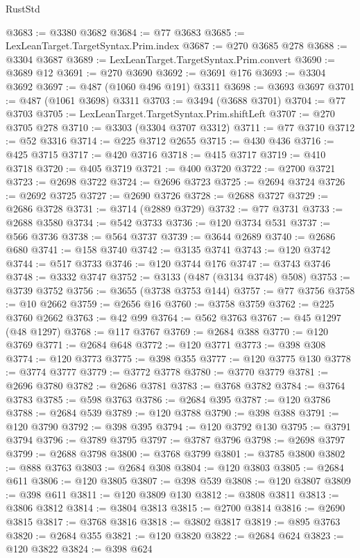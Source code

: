 \begin{lexlean}{RustStd}
\begin{coremodule}
@3683 := @3380 @3682
@3684 := @77 @3683
@3685 := LexLeanTarget.TargetSyntax.Prim.index
@3687 := @270 @3685 @278
@3688 := @3304 @3687
@3689 := LexLeanTarget.TargetSyntax.Prim.convert
@3690 := @3689 @12
@3691 := @270 @3690
@3692 := @3691 @176
@3693 := @3304 @3692
@3697 := @487 (@1060 @496 @191) @3311
@3698 := @3693 @3697
@3701 := @487 (@1061 @3698) @3311
@3703 := @3494 (@3688 @3701)
@3704 := @77 @3703
@3705 := LexLeanTarget.TargetSyntax.Prim.shiftLeft
@3707 := @270 @3705 @278
@3710 := @3303 (@3304 @3707 @3312)
@3711 := @77 @3710
@3712 := @52 @3316
@3714 := @225 @3712 @2655
@3715 := @430 @436
@3716 := @425 @3715
@3717 := @420 @3716
@3718 := @415 @3717
@3719 := @410 @3718
@3720 := @405 @3719
@3721 := @400 @3720
@3722 := @2700 @3721
@3723 := @2698 @3722
@3724 := @2696 @3723
@3725 := @2694 @3724
@3726 := @2692 @3725
@3727 := @2690 @3726
@3728 := @2688 @3727
@3729 := @2686 @3728
@3731 := @3714 (@2889 @3729)
@3732 := @77 @3731
@3733 := @2688 @3580
@3734 := @542 @3733
@3736 := @120 @3734 @531
@3737 := @566 @3736
@3738 := @564 @3737
@3739 := @3644 @2689
@3740 := @2686 @680
@3741 := @158 @3740
@3742 := @3135 @3741
@3743 := @120 @3742
@3744 := @517 @3733
@3746 := @120 @3744 @176
@3747 := @3743 @3746
@3748 := @3332 @3747
@3752 := @3133 (@487 (@3134 @3748) @508)
@3753 := @3739 @3752
@3756 := @3655 (@3738 @3753 @144)
@3757 := @77 @3756
@3758 := @10 @2662
@3759 := @2656 @16
@3760 := @3758 @3759
@3762 := @225 @3760 @2662
@3763 := @42 @99
@3764 := @562 @3763
@3767 := @45 @1297 (@48 @1297)
@3768 := @117 @3767
@3769 := @2684 @388
@3770 := @120 @3769
@3771 := @2684 @648
@3772 := @120 @3771
@3773 := @398 @308
@3774 := @120 @3773
@3775 := @398 @355
@3777 := @120 @3775 @130
@3778 := @3774 @3777
@3779 := @3772 @3778
@3780 := @3770 @3779
@3781 := @2696 @3780
@3782 := @2686 @3781
@3783 := @3768 @3782
@3784 := @3764 @3783
@3785 := @598 @3763
@3786 := @2684 @395
@3787 := @120 @3786
@3788 := @2684 @539
@3789 := @120 @3788
@3790 := @398 @388
@3791 := @120 @3790
@3792 := @398 @395
@3794 := @120 @3792 @130
@3795 := @3791 @3794
@3796 := @3789 @3795
@3797 := @3787 @3796
@3798 := @2698 @3797
@3799 := @2688 @3798
@3800 := @3768 @3799
@3801 := @3785 @3800
@3802 := @888 @3763
@3803 := @2684 @308
@3804 := @120 @3803
@3805 := @2684 @611
@3806 := @120 @3805
@3807 := @398 @539
@3808 := @120 @3807
@3809 := @398 @611
@3811 := @120 @3809 @130
@3812 := @3808 @3811
@3813 := @3806 @3812
@3814 := @3804 @3813
@3815 := @2700 @3814
@3816 := @2690 @3815
@3817 := @3768 @3816
@3818 := @3802 @3817
@3819 := @895 @3763
@3820 := @2684 @355
@3821 := @120 @3820
@3822 := @2684 @624
@3823 := @120 @3822
@3824 := @398 @624

\end{coremodule}
\end{lexlean}
